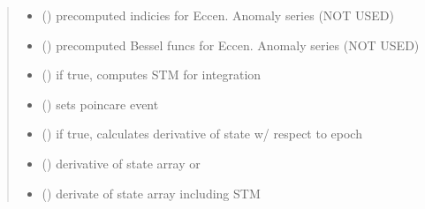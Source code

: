 \documentclass[letterpaper,10pt,english]{sphinxmanual}
\begin{document}
\begin{fulllineitems}
\begin{quote}
\begin{description}
\begin{itemize}
\item {} 
\sphinxAtStartPar
{} () \sphinxhyphen{}\sphinxhyphen{} pre\sphinxhyphen{}computed indicies for Eccen. Anomaly series (NOT USED)

\item {} 
\sphinxAtStartPar
{} () \sphinxhyphen{}\sphinxhyphen{} pre\sphinxhyphen{}computed Bessel funcs for Eccen. Anomaly series (NOT USED)

\item {} 
\sphinxAtStartPar
{} () \sphinxhyphen{}\sphinxhyphen{} if true, computes STM for integration

\item {} 
\sphinxAtStartPar
{} () \sphinxhyphen{}\sphinxhyphen{} sets poincare event

\item {} 
\sphinxAtStartPar
{} () \sphinxhyphen{}\sphinxhyphen{} if true, calculates derivative of state w/ respect to epoch

\end{itemize}

\sphinxAtStartPar
\begin{itemize}
\item {} 
\sphinxAtStartPar
{} () \sphinxhyphen{}\sphinxhyphen{} derivative of state array
or

\item {} 
\sphinxAtStartPar
{} () \sphinxhyphen{}\sphinxhyphen{} derivate of state array including STM

\end{itemize}


\end{description}\end{quote}

\end{fulllineitems}

\end{document}
